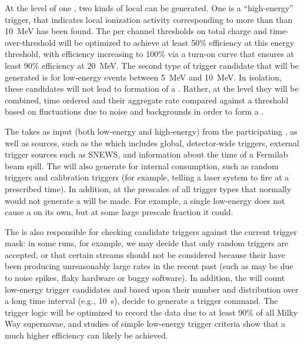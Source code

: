At the level of one , two kinds of local
 can be generated.
One is a ``high-energy'' trigger, that indicates local ionization
activity corresponding to more than than \SI{10}{\MeV} has been found.
The per channel thresholds on total charge and time-over-threshold
will be optimized to achieve at least 50\% efficiency at this energy
threshold, with efficiency increasing to 100\% via a turn-on curve
that ensures at least 90\% efficiency at \SI{20}{\MeV}. 
The second type of trigger candidate that will be generated is for
low-energy events between \SI{5}{\MeV} and \SI{10}{\MeV}. 
In isolation, these candidates will not lead to formation of a
. 
Rather, at the  level they will be combined, time
ordered and their aggregate rate compared against a threshold based on
fluctuations due to noise and backgrounds in order to form a
 .

The  takes as input  (both low-energy
and high-energy) from the participating , as well as
 sources, such as the  which includes
global, detector-wide triggers, external trigger sources such as
SNEWS, and information about the time of a Fermilab beam spill. 
The  will also generate  for internal
consumption, such as random triggers and calibration triggers (for
example, telling a laser system to fire at a prescribed time). 
In addition, at the  prescales of all trigger types that
normally would not generate a  will be made. 
For example, a single low-energy  does not cause
a  on its own, but at some large prescale fraction
it could.


The  is also responsible for checking candidate triggers
against the current  trigger mask: in some runs, for
example, we may decide that only random triggers are accepted, or that
certain  streams should not be considered
because their  have been producing unreasonably large
rates in the recent past (such as may be due to noise spikes, flaky
hardware or buggy software).
In addition, the  will count low-energy trigger candidates
and based upon their number and distribution over a long time interval
(e.g., \SI{10}{\s}), decide to generate a  trigger command.
The trigger logic will be optimized to record the data due to at least
90\% of all Milky Way supernovae, and studies of simple low-energy
trigger criteria show that a much higher efficiency can likely be
achieved.

